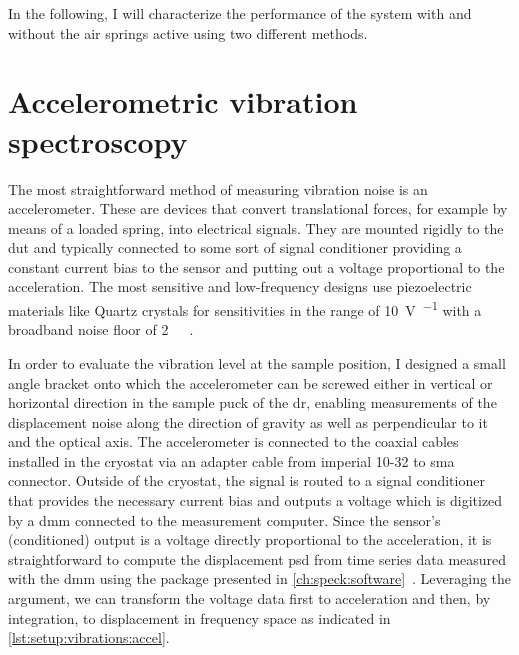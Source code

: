 In the following, I will characterize the performance of the system with and without the air springs active using two different methods.

\section{Accelerometric vibration spectroscopy}\label{sec:setup:vibrations:accel}
The most straightforward method of measuring vibration noise is an accelerometer.
These are devices that convert translational forces, for example by means of a loaded spring, into electrical signals.
They are mounted rigidly to the \gls{dut} and typically connected to some sort of signal conditioner providing a constant current bias to the sensor and putting out a voltage proportional to the acceleration.
The most sensitive and low-frequency designs use piezoelectric materials like Quartz crystals for sensitivities in the range of \qty{10}{\volt\per\gaccel} with a broadband noise floor of \qty{2}{\micro\gaccel}~\cite{WilcoxonAccel}.

In order to evaluate the vibration level at the sample position, I designed a small angle bracket onto which the accelerometer
can be screwed either in vertical or horizontal direction in the sample puck of the \gls{dr}, enabling measurements of the displacement noise along the direction of gravity as well as perpendicular to it and the optical axis.
The accelerometer is connected to the coaxial cables installed in the cryostat via an adapter cable from imperial 10-32 to \gls{sma} connector.
Outside of the cryostat, the signal is routed to a signal conditioner that provides the necessary current bias and outputs a voltage which is digitized by a \thedmm \gls{dmm} connected to the measurement computer.
Since the sensor's (conditioned) output is a voltage directly proportional to the acceleration, it is straightforward to compute the displacement \gls{psd} from time series data measured with the \gls{dmm} using the \pyspeck package presented in \cref{ch:speck:software}~\cite{Hangleiter_pyspeck}.
Leveraging the  argument, we can transform the voltage data first to acceleration and then, by integration, to displacement in frequency space as indicated in \cref{lst:setup:vibrations:accel}.

